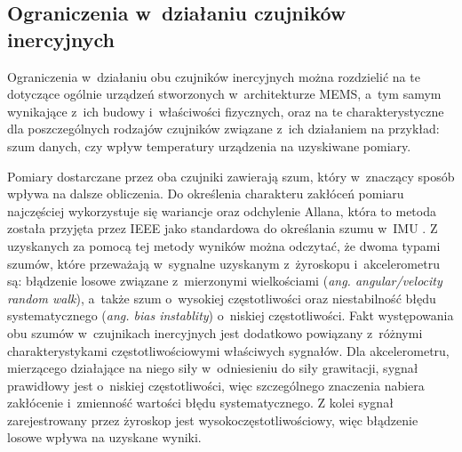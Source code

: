 \subsection{Ograniczenia w~działaniu czujników inercyjnych}
Ograniczenia w~działaniu obu czujników inercyjnych można rozdzielić na te dotyczące ogólnie urządzeń stworzonych w~architekturze MEMS, a~tym samym wynikające z~ich budowy i~właściwości fizycznych, oraz na te charakterystyczne dla poszczególnych rodzajów czujników związane z~ich działaniem na przykład: szum danych, czy wpływ temperatury urządzenia na uzyskiwane pomiary.

Pomiary dostarczane przez oba czujniki zawierają szum, który w~znaczący sposób wpływa na dalsze obliczenia. Do określenia charakteru zakłóceń pomiaru najczęściej wykorzystuje się wariancje oraz odchylenie Allana\cite{Allan1966}, która to metoda została przyjęta przez IEEE jako standardowa do określania szumu w~IMU \cite{IeeeAccSpec}. Z uzyskanych za pomocą tej metody wyników można odczytać, że dwoma typami szumów, które przeważają w~sygnalne uzyskanym z~żyroskopu i~akcelerometru są: błądzenie losowe związane z~mierzonymi wielkościami (\emph{ang. angular/velocity random walk}), a~także szum o~wysokiej częstotliwości oraz niestabilność błędu systematycznego (\emph{ang. bias instablity}) o~niskiej częstotliwości. Fakt występowania obu szumów w~czujnikach inercyjnych jest dodatkowo powiązany z~różnymi charakterystykami częstotliwościowymi właściwych sygnałów. Dla akcelerometru, mierzącego działające na niego siły w~odniesieniu do siły grawitacji, sygnał prawidłowy jest o~niskiej częstotliwości, więc szczególnego znaczenia nabiera zakłócenie i~zmienność wartości błędu systematycznego. Z kolei sygnał zarejestrowany przez żyroskop jest wysokoczęstotliwościowy, więc błądzenie losowe wpływa na uzyskane wyniki.

